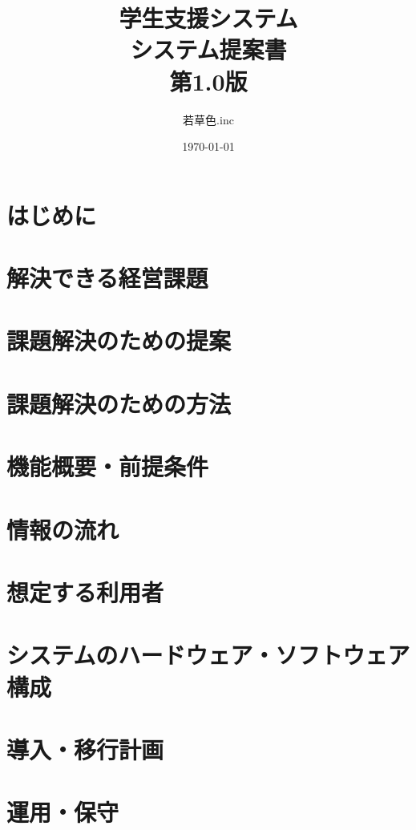\documentclass[a4j]{jarticle}
\title{
\vspace{30mm}
{\small 学生支援システム} 
\\
\vspace{5mm}
{\bf システム提案書\\}
\vspace{5mm}
{\small 第1.0版}
\vspace{90mm}
}
\date{\today}
\author{
\vspace{5mm}
  若草色.inc
\vspace{10mm}
}
\begin{document}
\maketitle

\newpage


\section{はじめに}



\section{解決できる経営課題}


\section{課題解決のための提案}


\section{課題解決のための方法}


\section{機能概要・前提条件}


\section{情報の流れ}


\section{想定する利用者}


\section{システムのハードウェア・ソフトウェア構成}


\section{導入・移行計画}


\section{運用・保守}

\end{document}
